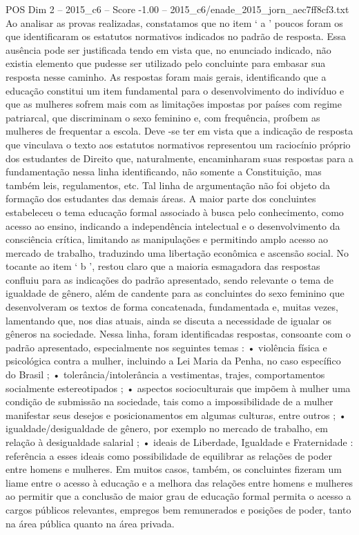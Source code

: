 \begin{textsample}{POS Dim 2 – 2015\_c6 – Score -1.00 – 2015\_c6/enade\_2015\_jorn\_aec7ff8cf3.txt}
Ao analisar as provas realizadas, constatamos que no item ‘ a ’ poucos foram os que identificaram os estatutos normativos indicados no padrão de resposta.
Essa ausência pode ser justificada tendo em vista que, no enunciado indicado, não existia elemento que pudesse ser utilizado pelo concluinte para embasar sua resposta nesse caminho.
As respostas foram mais gerais, identificando que a educação constitui um item fundamental para o desenvolvimento do indivíduo e que as mulheres sofrem mais com as limitações impostas por países com regime patriarcal, que discriminam o sexo feminino e, com frequência, proíbem as mulheres de frequentar a escola.
Deve -se ter em vista que a indicação de resposta que vinculava o texto aos estatutos normativos representou um raciocínio próprio dos estudantes de Direito que, naturalmente, encaminharam suas respostas para a fundamentação nessa linha identificando, não somente a Constituição, mas também leis, regulamentos, etc.
Tal linha de argumentação não foi objeto da formação dos estudantes das demais áreas.
A maior parte dos concluintes estabeleceu o tema educação formal associado à busca pelo conhecimento, como acesso ao ensino, indicando a independência intelectual e o desenvolvimento da consciência crítica, limitando as manipulações e permitindo amplo acesso ao mercado de trabalho, traduzindo uma libertação econômica e ascensão social.
No tocante ao item ‘ b ’, restou claro que a maioria esmagadora das respostas confluiu para as indicações do padrão apresentado, sendo relevante o tema de igualdade de gênero, além de candente para as concluintes do sexo feminino que desenvolveram os textos de forma concatenada, fundamentada e, muitas vezes, lamentando que, nos dias atuais, ainda se discuta a necessidade de igualar os gêneros na sociedade.
Nessa linha, foram identificadas respostas, consoante com o padrão apresentado, especialmente nos seguintes temas : • violência física e psicológica contra a mulher, incluindo a Lei Maria da Penha, no caso específico do Brasil ; • tolerância/intolerância a vestimentas, trajes, comportamentos socialmente estereotipados ; • aspectos socioculturais que impõem à mulher uma condição de submissão na sociedade, tais como a impossibilidade de a mulher manifestar seus desejos e posicionamentos em algumas culturas, entre outros ; • igualdade/desigualdade de gênero, por exemplo no mercado de trabalho, em relação à desigualdade salarial ; • ideais de Liberdade, Igualdade e Fraternidade : referência a esses ideais como possibilidade de equilibrar as relações de poder entre homens e mulheres.
Em muitos casos, também, os concluintes fizeram um liame entre o acesso à educação e a melhora das relações entre homens e mulheres ao permitir que a conclusão de maior grau de educação formal permita o acesso a cargos públicos relevantes, empregos bem remunerados e posições de poder, tanto na área pública quanto na área privada.

\end{textsample}
